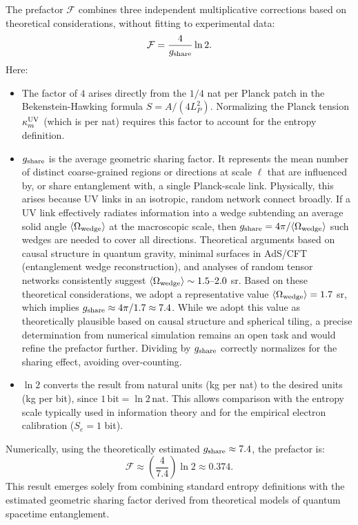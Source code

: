 \documentclass[11pt]{article}
\begin{document}
The prefactor $\mathcal{F}$ combines three independent multiplicative corrections based on theoretical considerations, without fitting to experimental data:
$$ \mathcal{F} = \frac{4}{g_{\rm share}} \ln 2. $$
Here:
\begin{itemize}
    \item The factor of $4$ arises directly from the $1/4$ nat per Planck patch in the Bekenstein-Hawking formula $S = A / (4 L_P^2)$. Normalizing the Planck tension $\kappa_m^{\rm UV}$ (which is per nat) requires this factor to account for the entropy definition.
    \item $g_{\rm share}$ is the average geometric sharing factor. It represents the mean number of distinct coarse-grained regions or directions at scale $\ell$ that are influenced by, or share entanglement with, a single Planck-scale link. Physically, this arises because UV links in an isotropic, random network connect broadly. If a UV link effectively radiates information into a wedge subtending an average solid angle $\langle \Omega_{\rm wedge} \rangle$ at the macroscopic scale, then $g_{\rm share} = 4\pi / \langle \Omega_{\rm wedge} \rangle$ such wedges are needed to cover all directions. Theoretical arguments based on causal structure in quantum gravity, minimal surfaces in AdS/CFT (entanglement wedge reconstruction), and analyses of random tensor networks consistently suggest $\langle \Omega_{\rm wedge} \rangle \sim 1.5\text{–}2.0$ sr. Based on these theoretical considerations, we adopt a representative value $\langle \Omega_{\rm wedge} \rangle = 1.7$ sr, which implies $g_{\rm share} \approx 4\pi / 1.7 \approx 7.4$. While we adopt this value as theoretically plausible based on causal structure and spherical tiling, a precise determination from numerical simulation remains an open task and would refine the prefactor further. Dividing by $g_{\rm share}$ correctly normalizes for the sharing effect, avoiding over-counting.
    \item $\ln 2$ converts the result from natural units (kg per nat) to the desired units (kg per bit), since $1\,\mathrm{bit} = \ln 2\,\mathrm{nat}$. This allows comparison with the entropy scale typically used in information theory and for the empirical electron calibration ($S_e=1$ bit).
\end{itemize}
Numerically, using the theoretically estimated $g_{\rm share} \approx 7.4$, the prefactor is:
$$ \mathcal{F} \approx \left(\frac{4}{7.4}\right)\ln 2 \approx 0.374. $$
This result emerges solely from combining standard entropy definitions with the estimated geometric sharing factor derived from theoretical models of quantum spacetime entanglement.
\end{document}
